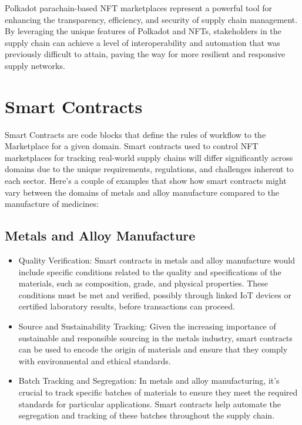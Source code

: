 \documentclass{tufte-handout}
\begin{document}
Polkadot parachain-based NFT marketplaces represent a powerful tool for enhancing the transparency, efficiency, and security of supply chain
management. By leveraging the unique features of Polkadot and NFTs, stakeholders in the supply chain can achieve a level of interoperability
and automation that was previously difficult to attain, paving the way for more resilient and responsive supply networks.

\section{Smart Contracts}\label{sec:page-layout}
Smart Contracts are code blocks that define the rules of workflow to the Marketplace for a given domain. Smart contracts used to control NFT
marketplaces for tracking real-world supply chains will differ significantly across domains due to the unique requirements, regulations, and
challenges inherent to each sector. Here's a couple of examples that show how smart contracts might vary between the domains of
metals and alloy manufacture compared to the manufacture of medicines:

\subsection{Metals and Alloy Manufacture}\label{sec:page-layout}
\begin{itemize}
    \item Quality Verification: Smart contracts in metals and alloy manufacture would include specific conditions related to the quality and
    specifications of the materials, such as composition, grade, and physical properties. These conditions must be met and verified, possibly
    through linked IoT devices or certified laboratory results, before transactions can proceed.
    \item Source and Sustainability Tracking: Given the increasing importance of sustainable and responsible sourcing in the metals industry,
    smart contracts can be used to encode the origin of materials and ensure that they comply with environmental and ethical standards.
    \item Batch Tracking and Segregation: In metals and alloy manufacturing, it's crucial to track specific batches of materials to ensure
    they meet the required standards for particular applications. Smart contracts help automate the segregation and tracking of these batches
    throughout the supply chain.
\end{itemize}
\end{document}
